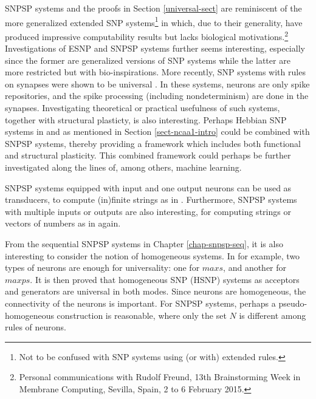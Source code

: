 SNPSP systems and the proofs in Section \ref{universal-sect} are reminiscent of the more generalized extended SNP systems\footnote{Not to be confused with SNP systems using (or with) extended rules.} in \cite{alhazov} which, due to their generality, have produced impressive computability results but lacks biological motivations.\footnote{Personal communications with Rudolf Freund, 13th Brainstorming Week in Membrane Computing, Sevilla, Spain, 2 to 6 February 2015.}
 Investigations  of ESNP and SNPSP systems further seems interesting, especially since the former are generalized versions of SNP systems while the latter are more restricted but with bio-inspirations. 
More recently, SNP systems with rules on synapses were shown to be universal \cite{synrules}. In these systems, neurons are only spike repositories, and the spike processing (including nondeterminism) are done in the synapses. Investigating theoretical or practical usefulness of such systems, together with structural plasticty, is also interesting.
Perhaps Hebbian SNP systems in \cite{snp-hebb} and as mentioned in Section \ref{sect-ncaa1-intro} could be combined with SNPSP systems, thereby providing a framework which includes both functional and structural plasticity.
This combined framework could perhaps be further investigated along the lines of, among others, machine learning.

SNPSP systems equipped with input and one output neurons can be used as transducers, to compute (in)finite strings as in \cite{snpmorph}. 
Furthermore, SNPSP systems with multiple inputs or outputs are also interesting, for computing strings or vectors of numbers as in \cite{alhazov} again.




From the sequential SNPSP systems in  Chapter \ref{chap-snpsp-seq}, it is also interesting to consider the notion of homogeneous systems. 
In \cite{Jiang-hsnp-maxs} for example, two types of neurons are enough for universality: one for $maxs$, and another for $maxps$. 
It is then proved that homogeneous SNP (HSNP) systems as acceptors and generators are universal in both modes. 
Since neurons are homogeneous, the connectivity of the neurons is important.
For SNPSP systems, perhaps a pseudo-homogeneous construction is reasonable, where only the set $N$ is different among rules of neurons. %



